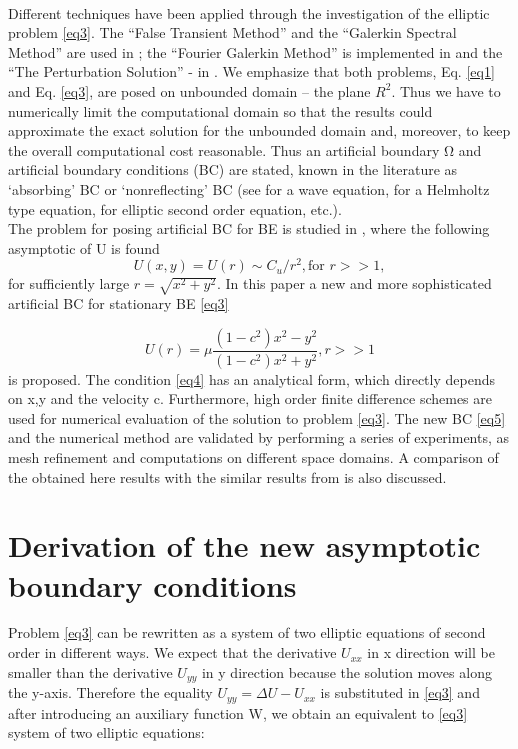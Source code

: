 \documentclass[12pt]{article}
\theoremstyle{theorem}
\theoremstyle{defi}
\begin{document}
\\
Different techniques have been applied through the investigation of the elliptic problem \eqref{eq3}. The “False Transient Method” and the “Galerkin Spectral Method” are used in \cite{ref6,ref9} ; the “Fourier Galerkin Method” is implemented in \cite{ref8,ref9} and the “The Perturbation Solution” - in \cite{ref10}.
We emphasize that both problems, Eq. \eqref{eq1} and Eq. \eqref{eq3}, are posed on unbounded domain – the plane $R^2$. Thus we have to numerically limit the computational domain so that the results could approximate the exact solution for the unbounded domain and, moreover, to keep the overall computational cost reasonable.
Thus an artificial boundary $Ω$ and artificial boundary conditions (BC) are stated, known in the literature as ‘absorbing’ BC or ‘nonreflecting’ BC (see \cite{ref11} for a wave equation, \cite{ref12} for a Helmholtz type equation, \cite{ref13} for elliptic second order equation, etc.). 
\\
The problem for posing artificial BC for BE is studied in \cite{ref6}, where the following asymptotic of U is found
\begin{equation}
U(x,y) = U(r) \sim  C_u/r^2, \text{for } r >> 1, \label{eq4}
\end{equation}
for sufficiently large $r=\sqrt{x^2 + y^2}$.
In this paper a new and more sophisticated artificial BC for stationary BE \eqref{eq3}

\begin{equation}
U(r) =  \mu \frac{(1-c^2)x^2 - y^2}{(1-c^2)x^2 + y^2}, r >> 1  \label{eq5}
\end{equation}
is proposed. The condition \eqref{eq4}  has an analytical form, which directly depends on x,y and the velocity c. Furthermore, high order finite difference schemes are used for numerical evaluation of the solution to problem \eqref{eq3}. The new BC \eqref{eq5} and the numerical method are validated by performing a series of experiments, as mesh refinement and computations on different space domains. A comparison of the obtained here results with the similar results from  \cite{ref10} is also discussed. 

\section{Derivation of the new asymptotic boundary conditions }

Problem \eqref{eq3} can be rewritten as a system of two elliptic equations of second order in different ways. We expect that the derivative  $U_{xx}$ in x direction will be smaller than the derivative $U_{yy}$  in y direction because the solution moves along the y-axis. Therefore the equality $U_{yy} = \Delta U - U_{xx}$  is substituted in \eqref{eq3} and after introducing an auxiliary function W, we obtain an equivalent to \eqref{eq3} system of two elliptic equations:
\end{document}
